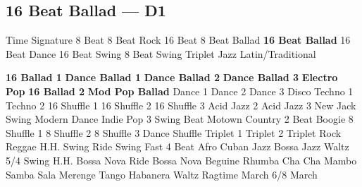 \subsection{16 Beat Ballad --- D1}
Time Signature
8 Beat
8 Beat Rock
16 Beat
8 Beat Ballad
\textbf{16 Beat Ballad}
16 Beat Dance
16 Beat Swing
8 Beat Swing
Triplet
Jazz
Latin/Traditional





























\textbf{16 Ballad 1}
\textbf{Dance Ballad 1}
\textbf{Dance Ballad 2}
\textbf{Dance Ballad 3}
\textbf{Electro Pop}
\textbf{16 Ballad 2}
\textbf{Mod Pop Ballad}
Dance 1
Dance 2
Dance 3
Disco
Techno 1
Techno 2
16 Shuffle 1
16 Shuffle 2
16 Shuffle 3
Acid Jazz 2
Acid Jazz 3
New Jack Swing
Modern Dance
Indie Pop 3
Swing Beat
Motown
Country 2 Beat
Boogie
8 Shuffle 1
8 Shuffle 2
8 Shuffle 3
Dance Shuffle
Triplet 1
Triplet 2
Triplet Rock
Reggae
H.H. Swing
Ride Swing
Fast 4 Beat
Afro Cuban
Jazz Bossa
Jazz Waltz
5/4 Swing
H.H. Bossa Nova
Ride Bossa Nova
Beguine
Rhumba
Cha Cha
Mambo
Samba
Sala
Merenge
Tango
Habanera
Waltz
Ragtime
March
6/8 March
